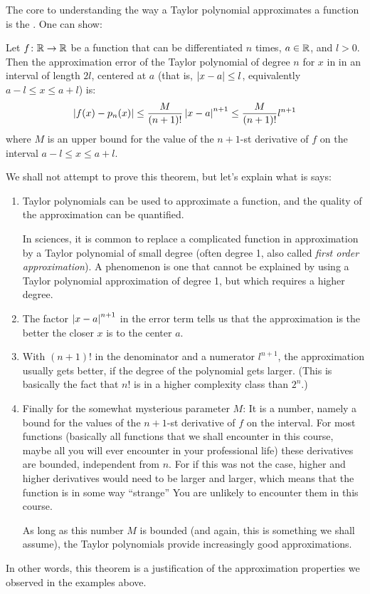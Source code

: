 The core to understanding the way a Taylor polynomial approximates a
function is the . One can show:
\begin{thm}
Let $f\colon{\mathbb R}\to{\mathbb R}$ be  a function that can be differentiated $n$ times,
$a\in{\mathbb R}$, and $l>0$.
Then the approximation error of the Taylor polynomial of degree $n$ for
$x$ in in an interval of length $2l$, centered at $a$ (that is,
$\left|x-a\right|\le l$, equivalently $a-l\le x\le a+l$) is:
\[
\left|f(x)-p_n(x)\right|\le \frac{M}{(n+1)!}\left|x-a\right|^{n+1}\le \frac{M}{(n+1)!}l^{n+1}
\]
where $M$ is an upper bound for the value of the $n+1$-st derivative of $f$
on the interval $a-l\le x\le a+l$.
\end{thm}
We shall not attempt to prove this theorem, but let's explain what is says:
\begin{enumerate}
\item
Taylor polynomials can be used to approximate a function, and the quality of
the approximation can be quantified.

In sciences, it is common to replace a complicated function in
approximation by a Taylor polynomial of small degree (often degree 1, also
called {\em first order approximation}). A
 phenomenon is one that cannot be explained by using a
Taylor polynomial approximation of degree 1, but which requires a higher
degree.
\item
The factor $\left|x-a\right|^{n+1}$ in the error term tells us that the
approximation is the better the closer $x$ is to the center $a$.
\item
With $(n+1)!$ in the denominator and a numerator $l^{n+1}$, the
approximation usually gets better, if the degree of the polynomial gets
larger. (This is basically the fact that $n!$ is in a higher complexity
class than $2^n$.)

\item
Finally for the somewhat mysterious parameter $M$: It is a number, namely a
bound for the values of the $n+1$-st derivative of $f$ on the interval. For
most functions (basically all functions that we shall encounter in this
course, maybe all you will ever encounter in your professional life) these
derivatives are bounded, independent from $n$. For if this was not the case,
higher and higher derivatives would need to be larger and larger, which
means that the function is in some way ``strange'' You are unlikely to encounter them in this course.

As long as this number $M$ is bounded (and again, this is something we shall
assume), the Taylor polynomials provide increasingly good approximations.
\end{enumerate}
In other words, this theorem is a justification of the approximation
properties we observed in the examples above.\smallskip

